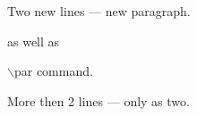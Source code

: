 \documentclass{article}
\begin{document}
\vspace*{\fill} \vspace*{-5ex}

Two new lines --- new paragraph.


as well as \par $\backslash$par command.



More then 2 lines --- only as two.

\vspace*{\fill}
\end{document}

